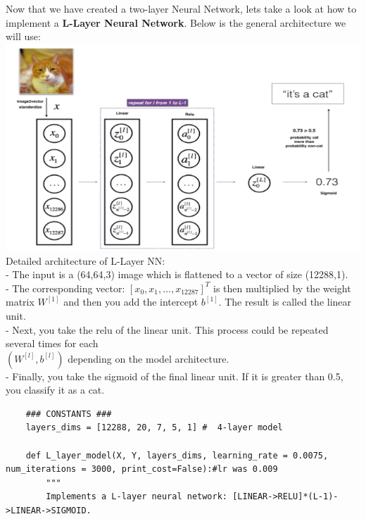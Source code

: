 \documentclass[11pt, a4paper]{article}
\begin{document}
\begin{spacing}{1.1}
	\noindent Now that we have created a two-layer Neural Network, lets take a look at how to implement a \textbf{L-Layer Neural Network}. Below is the general architecture we will use: \\
	\hspace*{17mm} \includegraphics[scale=.7]{l_layer_cat} \\
	Detailed architecture of L-Layer NN: \\
	\hspace*{3mm} - The input is a (64,64,3) image which is flattened to a vector of size (12288,1). \\
	\hspace*{3mm} - The corresponding vector: $[x_0,x_1,...,x_{12287}]^T$ is then multiplied by the weight matrix $W^{[1]}$ and then \hspace*{6mm} you add the intercept $b^{[1]}$. The result is called the linear unit. \\
	\hspace*{3mm} - Next, you take the relu of the linear unit. This process could be repeated several times for each \\ \hspace*{6mm} $(W^{[l]}, b^{[l]})$ depending on the model architecture. \\
	\hspace*{3mm} - Finally, you take the sigmoid of the final linear unit. If it is greater than 0.5, you classify it as a cat.
	\begin{lstlisting}
	### CONSTANTS ###
	layers_dims = [12288, 20, 7, 5, 1] #  4-layer model
	
	def L_layer_model(X, Y, layers_dims, learning_rate = 0.0075, num_iterations = 3000, print_cost=False):#lr was 0.009
		"""
		Implements a L-layer neural network: [LINEAR->RELU]*(L-1)->LINEAR->SIGMOID.
		

\end{lstlisting}
\end{spacing}
\end{document}
